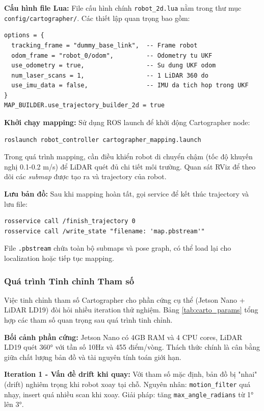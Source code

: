 \textbf{Cấu hình file Lua:} File cấu hình chính \texttt{robot\_2d.lua} nằm trong thư mục \texttt{config/cartographer/}. Các thiết lập quan trọng bao gồm:
\begin{lstlisting}[basicstyle=\small\ttfamily, caption={Cấu hình Cartographer cho mapping}, label={lst:carto_mapping}]
options = {
  tracking_frame = "dummy_base_link",  -- Frame robot
  odom_frame = "robot_0/odom",         -- Odometry tu UKF
  use_odometry = true,                 -- Su dung UKF odom
  num_laser_scans = 1,                 -- 1 LiDAR 360 do
  use_imu_data = false,                -- IMU da tich hop trong UKF
}
MAP_BUILDER.use_trajectory_builder_2d = true
\end{lstlisting}

\textbf{Khởi chạy mapping:} Sử dụng ROS launch để khởi động Cartographer node:
\begin{verbatim}
roslaunch robot_controller cartographer_mapping.launch
\end{verbatim}

Trong quá trình mapping, cần điều khiển robot di chuyển chậm (tốc độ khuyến nghị 0.1-0.2 m/s) để LiDAR quét đủ chi tiết môi trường. Quan sát RViz để theo dõi các \textit{submap} được tạo ra và trajectory của robot.

\textbf{Lưu bản đồ:} Sau khi mapping hoàn tất, gọi service để kết thúc trajectory và lưu file:
\begin{verbatim}
rosservice call /finish_trajectory 0
rosservice call /write_state "filename: 'map.pbstream'"
\end{verbatim}

File \texttt{.pbstream} chứa toàn bộ submaps và pose graph, có thể load lại cho localization hoặc tiếp tục mapping.

\subsubsection{Quá trình Tinh chỉnh Tham số}
\label{subsec:param_tuning}

Việc tinh chỉnh tham số Cartographer cho phần cứng cụ thể (Jetson Nano + LiDAR LD19) đòi hỏi nhiều iteration thử nghiệm. Bảng \ref{tab:carto_params} tổng hợp các tham số quan trọng sau quá trình tinh chỉnh.

\textbf{Bối cảnh phần cứng:} Jetson Nano có 4GB RAM và 4 CPU cores, LiDAR LD19 quét 360° với tần số 10Hz và 455 điểm/vòng. Thách thức chính là cân bằng giữa chất lượng bản đồ và tài nguyên tính toán giới hạn.

\textbf{Iteration 1 - Vấn đề drift khi quay:} Với tham số mặc định, bản đồ bị "nhai" (drift) nghiêm trọng khi robot xoay tại chỗ. Nguyên nhân: \texttt{motion\_filter} quá nhạy, insert quá nhiều scan khi xoay. Giải pháp: tăng \texttt{max\_angle\_radians} từ 1° lên 3°.

